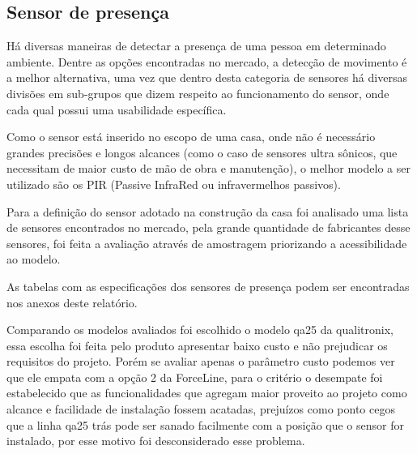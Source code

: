\subsection{Sensor de presença}
\par Há diversas maneiras de detectar a presença de uma pessoa em determinado ambiente. Dentre as opções encontradas no mercado, a detecção de movimento é a melhor alternativa, uma vez que dentro desta categoria de sensores há diversas divisões em sub-grupos que dizem respeito ao funcionamento do sensor, onde cada qual possui uma usabilidade específica.
\par Como o sensor está inserido no escopo de uma casa, onde não é necessário grandes precisões e longos alcances (como o caso de sensores ultra sônicos, que necessitam de maior custo de mão de obra e manutenção), o melhor modelo a ser utilizado são os PIR (Passive InfraRed ou infravermelhos passivos).
\par Para a definição do sensor adotado na construção da casa foi analisado uma lista de sensores encontrados no mercado, pela grande quantidade de fabricantes desse sensores, foi feita a avaliação através de amostragem priorizando a acessibilidade ao modelo.
\par As tabelas com as especificações dos sensores de presença podem ser encontradas nos anexos deste relatório.

\par Comparando os modelos avaliados foi escolhido o modelo qa25 da qualitronix, essa escolha foi feita pelo produto apresentar baixo custo e não prejudicar os requisitos do projeto. Porém se avaliar apenas o parâmetro custo podemos ver que ele empata com a opção 2 da ForceLine, para o critério o desempate foi estabelecido que as funcionalidades que agregam maior proveito ao projeto como alcance e facilidade de instalação fossem acatadas, prejuízos como ponto cegos que a linha qa25 trás pode ser sanado facilmente com a posição que o sensor for instalado, por esse motivo foi desconsiderado esse problema.

